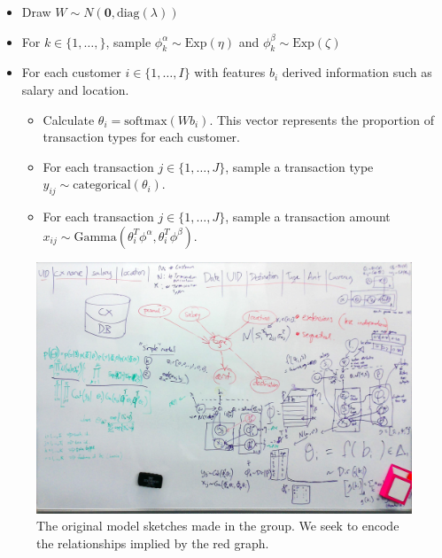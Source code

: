 \documentclass[]{article}
\begin{document}
\begin{itemize}
\tightlist
\item
  Draw \(W \sim N(\boldsymbol 0,\text{diag}(\lambda))\)
\item
  For \(k\in\{1,\dots,\}\), sample
  \(\phi_k^\alpha \sim \text{Exp}(\eta)\) and
  \(\phi_k^\beta \sim \text{Exp}(\zeta)\)
\item
  For each customer \(i \in \{1,\dots,I\}\) with features \(b_i\)
  derived information such as salary and location.

  \begin{itemize}
  \tightlist
  \item
    Calculate \(\theta_i = \text{softmax}(W b_i)\). This vector
    represents the proportion of transaction types for each customer.
  \item
    For each transaction \(j \in \{1,\dots,J\}\), sample a transaction
    type \(y_{ij}\sim\text{categorical}(\theta_i)\).
  \item
    For each transaction \(j \in \{1,\dots,J\}\), sample a transaction
    amount
    \(x_{ij}\sim\text{Gamma}(\theta_i^T\phi^\alpha, \theta_i^T\phi^\beta)\).
  \end{itemize}
\end{itemize}

\begin{figure}
    \centering
    \includegraphics{uploads/upload_f3cde5816b6bbcecbbdc3436ed9f3b34.jpg}
    \caption{The original model sketches made in the group. We seek to
encode the relationships implied by the red graph.}
    \label{fig:simple_model_sketch}
\end{figure}
\end{document}
